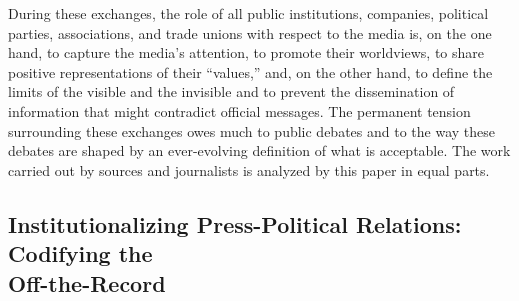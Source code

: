 \documentclass{tufte-handout}
\begin{document}
\newpage During these exchanges, the role of all public institutions, companies,
political parties, associations, and trade unions with respect to the
media is, on the one hand, to capture the media's attention, to promote
their worldviews, to share positive representations of their ``values,''
and, on the other hand, to define the limits of the visible and the
invisible and to prevent the dissemination of information that might
contradict official messages. The permanent tension surrounding these
exchanges owes much to public debates and to the way these debates are
shaped by an ever-evolving definition of what is acceptable. The work
carried out by sources and journalists is analyzed by this paper in
equal parts.

\hypertarget{institutionalizing-press-political-relations-codifying-the-off-the-record}{%
\subsection{Institutionalizing Press-Political
Relations: Codifying the\\\noident
Off-the-Record}\label{institutionalizing-press-political-relations-codifying-the-off-the-record}}
\end{document}
